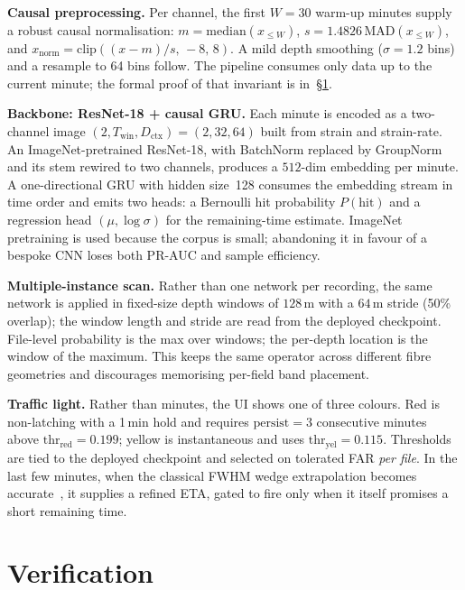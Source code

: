 \documentclass{article}
\begin{document}
\textbf{Causal preprocessing.} Per channel, the first $W = 30$ warm-up
minutes supply a robust causal normalisation:
$m = \mathrm{median}(x_{\le W})$,
$s = 1.4826\,\mathrm{MAD}(x_{\le W})$, and
$x_\text{norm} = \mathrm{clip}((x - m)/s,\,-8,\,8)$. A mild depth
smoothing ($\sigma = 1.2$ bins) and a resample to 64 bins follow. The
pipeline consumes only data up to the current minute; the formal proof
of that invariant is in~\S\ref{sec:verification}.

\textbf{Backbone: ResNet-18 + causal GRU.} Each minute is encoded as a
two-channel image
$(2, T_\text{win}, D_\text{ctx}) = (2, 32, 64)$ built from strain and
strain-rate. An ImageNet-pretrained ResNet-18, with BatchNorm replaced
by GroupNorm and its stem rewired to two channels, produces a
$512$-dim embedding per minute. A one-directional GRU with hidden
size~128 consumes the embedding stream in time order and emits two
heads: a Bernoulli hit probability $P(\text{hit})$ and a regression
head $(\mu, \log\sigma)$ for the remaining-time estimate. ImageNet
pretraining is used because the corpus is small; abandoning it in
favour of a bespoke CNN loses both PR-AUC and sample efficiency.

\textbf{Multiple-instance scan.} Rather than one network per recording,
the same network is applied in fixed-size depth windows of $128$\,m
with a $64$\,m stride (50\% overlap); the window length and stride are
read from the deployed checkpoint. File-level probability is the max
over windows; the per-depth location is the window of the maximum.
This keeps the same operator across different fibre geometries and
discourages memorising per-field band placement.

\textbf{Traffic light.} Rather than minutes, the UI shows one of three
colours. Red is non-latching with a 1\,min hold and requires
$\text{persist} = 3$ consecutive minutes above
$\mathrm{thr}_\text{red} = 0.199$; yellow is instantaneous and uses
$\mathrm{thr}_\text{yel} = 0.115$. Thresholds are tied to the deployed
checkpoint and selected on tolerated FAR \emph{per file}. In the last
few minutes, when the classical FWHM wedge extrapolation becomes
accurate~\cite{liu2020,li2024}, it supplies a refined ETA, gated to
fire only when it itself promises a short remaining time.

\section{Verification}
\label{sec:verification}
\end{document}

